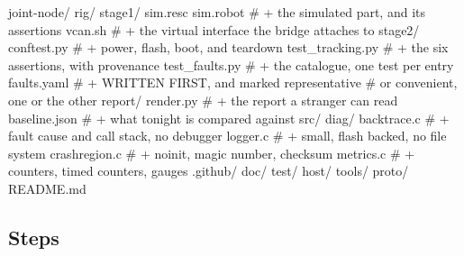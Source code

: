 \begin{plaincode}
joint-node/
  rig/
    stage1/
      sim.resc  sim.robot      # + the simulated part, and its assertions
      vcan.sh                  # + the virtual interface the bridge attaches to
    stage2/
      conftest.py              # + power, flash, boot, and teardown
      test_tracking.py         # + the six assertions, with provenance
      test_faults.py           # + the catalogue, one test per entry
      faults.yaml              # + WRITTEN FIRST, and marked representative
                               #   or convenient, one or the other
    report/
      render.py                # + the report a stranger can read
      baseline.json            # + what tonight is compared against
  src/
    diag/
      backtrace.c              # + fault cause and call stack, no debugger
      logger.c                 # + small, flash backed, no file system
      crashregion.c            # + noinit, magic number, checksum
      metrics.c                # + counters, timed counters, gauges
  .github/  doc/  test/  host/  tools/  proto/  README.md
\end{plaincode}

\subsection*{Steps}


